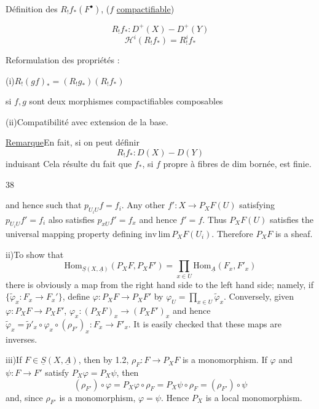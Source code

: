 Définition des $R_!f_*(F^\bullet)$, ($f$ \uline{compactifiable})

\[
R_!f_*:D^+(X)\mathbin{-}D^+(Y)
\]
\[
\mathcal H^i(R_!f_*)=R^i_!f_*
\]

Reformulation des propriétés  :

(i)\quad $R_!(gf)_*=(R_!g_*)(R_!f_*)$

si $f,g$ sont deux morphismes compactifiables composables

(ii)\quad Compatibilité avec extension de la base.

\uline{Remarque}\quad En fait, si
on peut définir
\[
R_!f_*:D(X)\mathbin{-}D(Y)
\]
induisant
Cela résulte du fait que $f_*$, si $f$ propre à fibres de dim bornée,
est   finie.

\hfill 38

and hence such that $p_{U_iU}f=f_i$. Any other
$f':X\longrightarrow P_XF(U)$ satisfying $p_{U_iU}f'=f_i$ also satisfies
$p_{xU}f'=f_x$ and hence $f'=f$.
Thus $P_XF(U)$ satisfies the universal mapping property defining
$\mathrm{inv\,lim}\,P_XF(U_i)$. Therefore $P_XF$ is a sheaf.

ii)\quad To show that
\[
\mathrm{Hom}_{\underline S(X,\underline A)}(P_XF,P_XF')
=\prod_{x\in U}\mathrm{Hom}_{\underline A}(F_x,F'_x)
\]
there is obviously a map from the right hand side to the left hand side;
namely, if $\{\tilde\varphi_x:F_x\longrightarrow F_x'\}$, define
$\varphi:P_XF\longrightarrow P_XF'$ by
$\varphi_U=\prod_{x\in U}\tilde\varphi_x$.
Conversely, given $\varphi:P_XF\longrightarrow P_XF'$,
$\varphi_x:(P_XF)_x\longrightarrow(P_XF')_x$ and hence
$\tilde\varphi_x=\tilde p'_x\circ\varphi_x\circ(\rho_{F'})_x:
F_x\longrightarrow F'_x$.
It is easily checked that these maps are inverses.

iii)\quad If $F\in\underline S(X,\underline A)$, then by 1.2,
$\rho_F:F\longrightarrow P_XF$ is a monomorphism.
If $\varphi$ and $\psi:F\longrightarrow F'$ satisfy $P_X\varphi=P_X\psi$,
then
\[
(\rho_{F'})\circ\varphi=P_X\varphi\circ\rho_F
=P_X\psi\circ\rho_F=(\rho_{F'})\circ\psi
\]
and, since $\rho_{F'}$ is a monomorphism, $\varphi=\psi$.
Hence $P_X$ is a local monomorphism.

